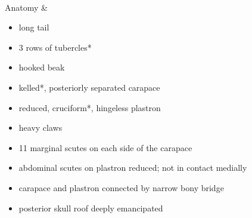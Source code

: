 \begin{center}
\begin{longtabu}
	 \\
	\hline
	Anatomy &
	\begin{itemize}[noitemsep]
		\item long tail
		\item 3 rows of tubercles*
		\item hooked beak
		\item kelled*, posteriorly separated carapace
		\item reduced, cruciform*, hingeless plastron
		\item heavy claws
		\item 11 marginal scutes on each side of the carapace
		\item abdominal scutes on plastron reduced; not in contact medially
		\item carapace and plastron connected by narrow bony bridge
		\item posterior skull roof deeply emancipated
	\end{itemize}
	

\end{longtabu}
\end{center}
